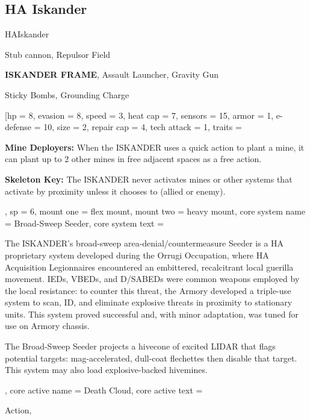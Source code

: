 \subsection{HA Iskander}

\begin{mech}{HA}{Iskander}


\begin{license}
\item Stub cannon, Repulsor Field
\item \textbf{ISKANDER FRAME}, Assault Launcher, Gravity Gun
\item Sticky Bombs, Grounding Charge
\end{license}

\frameBox
[hp = 8,
evasion = 8,
speed = 3,
heat cap = 7,
sensors = 15,
armor = 1,
e-defense = 10,
size = 2,
repair cap = 4,
tech attack = 1,
traits = {\textbf{Mine Deployers:} When the ISKANDER uses a quick action to plant a mine, it can plant up to 2 other mines in free adjacent spaces as a free action.

\textbf{Skeleton Key:} The ISKANDER never activates mines or other systems that activate by proximity unless it chooses to (allied or enemy).},
sp = 6,
mount one = flex mount,
mount two = heavy mount,
core system name = Broad-Sweep Seeder,
core system text = {The ISKANDER’s broad-sweep area-denial/countermeasure Seeder is a HA proprietary system developed during the Orrugi Occupation, where HA Acquisition Legionnaires encountered an embittered, recalcitrant local guerilla movement. IEDs, VBEDs, and D/SABEDs were common weapons employed by the local resistance: to counter this threat, the Armory developed a triple-use system to scan, ID, and eliminate explosive threats in proximity to stationary units. This system proved successful and, with minor adaptation, was tuned for use on Armory chassis.

The Broad-Sweep Seeder projects a hivecone of excited LIDAR that flags potential targets: mag-accelerated, dull-coat flechettes then disable that target. This system may also load explosive-backed hivemines.},
core active name = Death Cloud,
core active text = {Action,

}
\end{mech}
